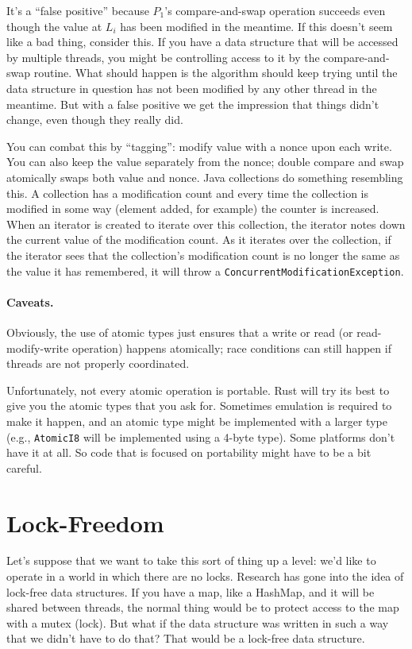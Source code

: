 It's a ``false positive'' because $P_{1}$'s compare-and-swap operation succeeds even though the value at $L_{i}$ has been modified in the meantime. If this doesn't seem like a bad thing, consider this. If you have a data structure that will be accessed by multiple threads, you might be controlling access to it by the compare-and-swap routine. What should happen is the algorithm should keep trying until the data structure in question has not been modified by any other thread in the meantime. But with a false positive we get the impression that things didn't change, even though they really did.

You can combat this by ``tagging'': modify value with a nonce upon each
write. You can also keep the value separately from the nonce; double
compare and swap atomically swaps both value and nonce. Java collections do something resembling this. A collection has a modification count and every time the collection is modified in some way (element added, for example) the counter is increased. When an iterator is created to iterate over this collection, the iterator notes down the current value of the modification count. As it iterates over the collection, if the iterator sees that the collection's modification count is no longer the same as the value it has remembered, it will throw a \texttt{ConcurrentModificationException}. 


\paragraph{Caveats.}
Obviously, the use of atomic types just ensures that a write or read (or read-modify-write operation) happens atomically; race conditions can still happen if threads are not properly coordinated.


Unfortunately, not every atomic operation is portable. Rust will try its best to give you the atomic types that you ask for. Sometimes emulation is required to make it happen, and an atomic type might be implemented with a larger type (e.g., \texttt{AtomicI8} will be implemented using a 4-byte type). Some platforms don't have it at all. So code that is focused on portability might have to be a bit careful.

\section*{Lock-Freedom}

Let's suppose that we want to take this sort of thing up a level: we'd like to operate in a world in which there are no locks. Research has gone into the idea of lock-free data structures. If you have a map, like a HashMap, and it will be shared between threads, the normal thing would be to protect access to the map with a mutex (lock). But what if the data structure was written in such a way that we didn't have to do that? That would be a lock-free data structure.

